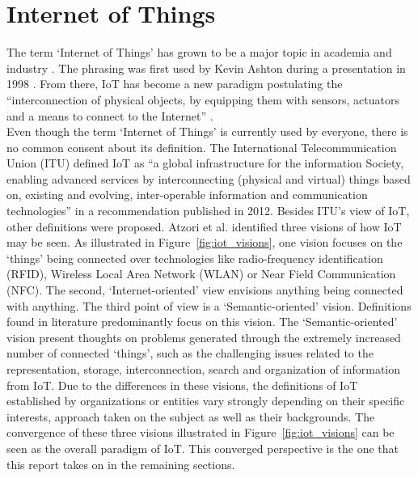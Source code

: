 \section{Internet of Things}
\label{sec:iot}
\vspace{-1em}
	The term `Internet of Things' has grown to be a major topic in academia and industry \cite{ju}. The phrasing was first used by Kevin Ashton during a presentation in 1998 \cite{westerlund}. From there, IoT has become a new paradigm postulating the ``interconnection of physical objects, by equipping them with sensors, actuators and a means to connect to the Internet'' \cite{dijkman}.\\
	Even though the term `Internet of Things' is currently used by everyone, there is no common consent about its definition. The International Telecommunication Union (ITU) defined IoT as ``a global infrastructure for the information Society, enabling advanced services by interconnecting (physical and virtual) things based on, existing and evolving, inter-operable information and communication technologies'' \cite{itu} in a recommendation published in 2012. Besides ITU's view of IoT, other definitions were proposed. Atzori et al. \cite{atzori} identified three visions of how IoT may be seen. As illustrated in Figure~\ref{fig:iot_visions}, one vision focuses on the `things' being connected over technologies like radio-frequency identification (RFID), Wireless Local Area Network (WLAN) or Near Field Communication (NFC). The second, `Internet-oriented' view envisions anything being connected with anything. The third point of view is a `Semantic-oriented' vision. Definitions found in literature predominantly focus on this vision. The `Semantic-oriented' vision present thoughts on problems generated through the extremely increased number of connected `things', such as the challenging issues related to the representation, storage, interconnection, search and organization of information from IoT. Due to the differences in these visions, the definitions of IoT established by organizations or entities vary strongly depending on their specific interests, approach taken on the subject as well as their backgrounds. The convergence of these three visions illustrated in Figure~\ref{fig:iot_visions} can be seen as the overall paradigm of IoT. This converged perspective is the one that this report takes on in the remaining sections. 

